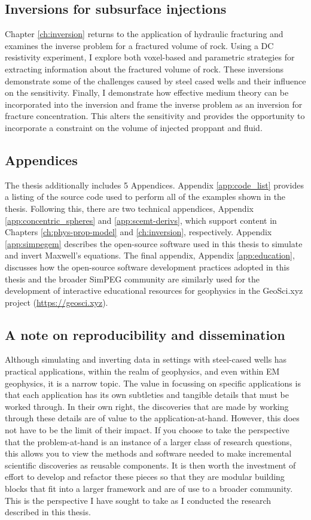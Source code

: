 \subsection{Inversions for subsurface injections}
Chapter \ref{ch:inversion} returns to the application of hydraulic fracturing and examines the inverse problem for a fractured volume of rock. Using a DC resistivity experiment, I explore both voxel-based and parametric strategies for extracting information about the fractured volume of rock. These inversions demonstrate some of the challenges caused by steel cased wells and their influence on the sensitivity. Finally, I demonstrate how effective medium theory can be incorporated into the inversion and frame the inverse problem as an inversion for fracture concentration. This alters the sensitivity and provides the opportunity to incorporate a constraint on the volume of injected proppant and fluid.
\subsection{Appendices}
The thesis additionally includes 5 Appendices. Appendix \ref{app:code_list} provides a listing of the source code used to perform all of the examples shown in the thesis. Following this, there are two technical appendices, Appendix \ref{app:concentric_spheres} and \ref{app:scemt-derivs}, which support content in Chapters \ref{ch:phys-prop-model} and \ref{ch:inversion}, respectively. Appendix \ref{app:simpegem} describes the open-source software used in this thesis to simulate and invert Maxwell's equations. The final appendix, Appendix \ref{app:education}, discusses how the open-source software development practices adopted in this thesis and the broader SimPEG community are similarly used for the development of interactive educational resources for geophysics in the GeoSci.xyz project (\href{https://geosci.xyz}{https://geosci.xyz}).

\subsection{A note on reproducibility and dissemination}

Although simulating and inverting data in settings with steel-cased wells has practical applications, within the realm of geophysics, and even within EM geophysics, it is a narrow topic. The value in focussing on specific applications is that each application has its own subtleties and tangible details that must be worked through. In their own right, the discoveries that are made by working through these details are of value to the application-at-hand. However, this does not have to be the limit of their impact. If you choose to take the perspective that the problem-at-hand is an instance of a larger class of research questions, this allows you to view the methods and software needed to make incremental scientific discoveries as reusable components. It is then worth the investment of effort to develop and refactor these pieces so that they are modular building blocks that fit into a larger framework and are of use to a broader community. This is the perspective I have sought to take as I conducted the research described in this thesis.

